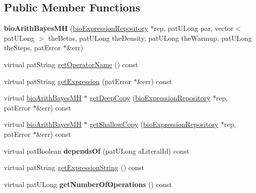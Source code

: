 \subsection*{Public Member Functions}
\begin{DoxyCompactItemize}
\item 
\mbox{\label{classbio_arith_bayes_m_h_a2fb0d44775923779ed7ba9f4274537e2}} 
{\bfseries bio\+Arith\+Bayes\+MH} (\hyperlink{classbio_expression_repository}{bio\+Expression\+Repository} $\ast$rep, pat\+U\+Long par, vector$<$ pat\+U\+Long $>$ the\+Betas, pat\+U\+Long the\+Density, pat\+U\+Long the\+Warmup, pat\+U\+Long the\+Steps, pat\+Error $\ast$\&err)
\item 
virtual pat\+String \hyperlink{classbio_arith_bayes_m_h_a9bf7951a901c6243af0ffc89bc5b6018}{get\+Operator\+Name} () const
\item 
virtual pat\+String \hyperlink{classbio_arith_bayes_m_h_a7579a02175af9bde0e35c0548a6740bd}{get\+Expression} (pat\+Error $\ast$\&err) const
\item 
virtual \hyperlink{classbio_arith_bayes_m_h}{bio\+Arith\+Bayes\+MH} $\ast$ \hyperlink{classbio_arith_bayes_m_h_a4477bd620cc50e05a248df51e8c74ad6}{get\+Deep\+Copy} (\hyperlink{classbio_expression_repository}{bio\+Expression\+Repository} $\ast$rep, pat\+Error $\ast$\&err) const
\item 
virtual \hyperlink{classbio_arith_bayes_m_h}{bio\+Arith\+Bayes\+MH} $\ast$ \hyperlink{classbio_arith_bayes_m_h_ab173e10b34d0eab2599ba4854f928b8f}{get\+Shallow\+Copy} (\hyperlink{classbio_expression_repository}{bio\+Expression\+Repository} $\ast$rep, pat\+Error $\ast$\&err) const
\item 
\mbox{\label{classbio_arith_bayes_m_h_a1cfbf01cc05e45338a692510347b636c}} 
virtual pat\+Boolean {\bfseries depends\+Of} (pat\+U\+Long a\+Literal\+Id) const
\item 
virtual pat\+String \hyperlink{classbio_arith_bayes_m_h_a0211e07769cd7b73f6dc344884656199}{get\+Expression\+String} () const
\item 
\mbox{\label{classbio_arith_bayes_m_h_a80b66eeffb3aa3d2198549d3f811d047}} 
virtual pat\+U\+Long {\bfseries get\+Number\+Of\+Operations} () const
\item 
\mbox{\label{classbio_arith_bayes_m_h_a2db66f75cb9fe1d5fb005a53bd8e3f19}} 

\end{DoxyCompactItemize}
